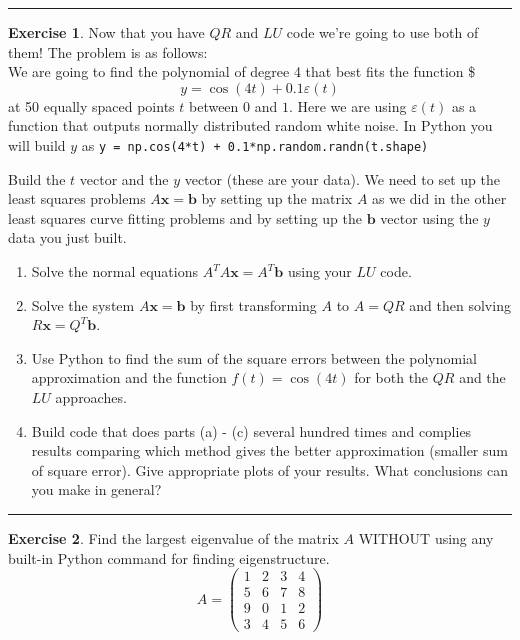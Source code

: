 \documentclass[
]{book}
\providecommand{\tightlist}{%
  \setlength{\itemsep}{0pt}\setlength{\parskip}{0pt}}
\theoremstyle{definition}
\theoremstyle{definition}
\theoremstyle{definition}
\newtheorem{exercise}{Exercise}[chapter]
\theoremstyle{remark}
\begin{document}
\begin{center}\rule{0.5\linewidth}{0.5pt}\end{center}

\begin{exercise}
\protect\hypertarget{exr:unnamed-chunk-392}{}{\label{exr:unnamed-chunk-392} }Now that you have \(QR\) and \(LU\) code we're going to use both of them! The problem is as follows:\\
We are going to find the polynomial of degree 4 that best fits the function
\$\[ y = \cos(4t) + 0.1 \varepsilon(t) \]
at 50 equally spaced points \(t\) between \(0\) and \(1\). Here we are using \(\varepsilon(t)\) as a function that outputs normally distributed random white noise. In Python you will build \(y\) as \texttt{y\ =\ np.cos(4*t)\ +\ 0.1*np.random.randn(t.shape)}

Build the \(t\) vector and the \(y\) vector (these are your data). We need to set up the least squares problems \(A \boldsymbol{x} = \boldsymbol{b}\) by setting up the matrix \(A\) as we did in the other least squares curve fitting problems and by setting up the \(\boldsymbol{b}\) vector using the \(y\) data you just built.

\begin{enumerate}
\def\labelenumi{\alph{enumi}.}
\tightlist
\item
  Solve the normal equations \(A^T A \boldsymbol{x} = A^T \boldsymbol{b}\) using your \(LU\) code.
\item
  Solve the system \(A \boldsymbol{x} = \boldsymbol{b}\) by first transforming \(A\) to \(A = QR\) and then solving \(R\boldsymbol{x} = Q^T \boldsymbol{b}\).
\item
  Use Python to find the sum of the square errors between the polynomial approximation and the function \(f(t) = \cos(4t)\) for both the \(QR\) and the \(LU\) approaches.
\item
  Build code that does parts (a) - (c) several hundred times and complies results comparing which method gives the better approximation (smaller sum of square error). Give appropriate plots of your results. What conclusions can you make in general?
\end{enumerate}
\end{exercise}

\begin{center}\rule{0.5\linewidth}{0.5pt}\end{center}

\begin{exercise}
\protect\hypertarget{exr:unnamed-chunk-393}{}{\label{exr:unnamed-chunk-393} }Find the largest eigenvalue of the matrix \(A\) WITHOUT using any built-in Python command for finding eigenstructure.
\[A = \begin{pmatrix} 1 & 2 & 3 & 4 \\ 5 & 6 & 7 & 8 \\ 9 & 0 & 1 & 2 \\ 3 & 4 & 5 &
        6 \end{pmatrix}\]
\end{exercise}
\end{document}
